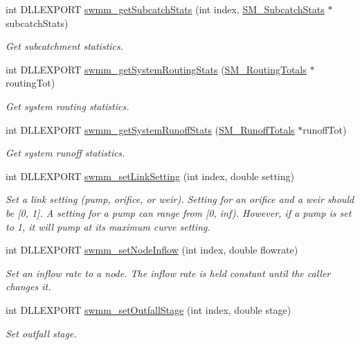 \begin{DoxyCompactItemize}
int D\+L\+L\+E\+X\+P\+O\+RT \hyperlink{group__tkfuncs_ga07cf0c633357b86bfcd0886fed0ae2fb}{swmm\+\_\+get\+Subcatch\+Stats} (int index, \hyperlink{struct_s_m___subcatch_stats}{S\+M\+\_\+\+Subcatch\+Stats} $\ast$subcatch\+Stats)
\begin{DoxyCompactList}\small\item\em Get subcatchment statistics. \end{DoxyCompactList}\item 
int D\+L\+L\+E\+X\+P\+O\+RT \hyperlink{group__tkfuncs_ga8e4dcd4d9243ac428633e7cdabf0712a}{swmm\+\_\+get\+System\+Routing\+Stats} (\hyperlink{struct_s_m___routing_totals}{S\+M\+\_\+\+Routing\+Totals} $\ast$routing\+Tot)
\begin{DoxyCompactList}\small\item\em Get system routing statistics. \end{DoxyCompactList}\item 
int D\+L\+L\+E\+X\+P\+O\+RT \hyperlink{group__tkfuncs_gabf3ea290e2af763289e18db435ea2ccd}{swmm\+\_\+get\+System\+Runoff\+Stats} (\hyperlink{struct_s_m___runoff_totals}{S\+M\+\_\+\+Runoff\+Totals} $\ast$runoff\+Tot)
\begin{DoxyCompactList}\small\item\em Get system runoff statistics. \end{DoxyCompactList}\item 
int D\+L\+L\+E\+X\+P\+O\+RT \hyperlink{group__tkfuncs_gab44d2b1c21a6f750b0ce4c48ba16be81}{swmm\+\_\+set\+Link\+Setting} (int index, double setting)
\begin{DoxyCompactList}\small\item\em Set a link setting (pump, orifice, or weir). Setting for an orifice and a weir should be \mbox{[}0, 1\mbox{]}. A setting for a pump can range from \mbox{[}0, inf). However, if a pump is set to 1, it will pump at its maximum curve setting. \end{DoxyCompactList}\item 
int D\+L\+L\+E\+X\+P\+O\+RT \hyperlink{group__tkfuncs_ga6438a8a45d7712b8b02ba630cd8e1db3}{swmm\+\_\+set\+Node\+Inflow} (int index, double flowrate)
\begin{DoxyCompactList}\small\item\em Set an inflow rate to a node. The inflow rate is held constant until the caller changes it. \end{DoxyCompactList}\item 
int D\+L\+L\+E\+X\+P\+O\+RT \hyperlink{group__tkfuncs_ga80d902400625073d8ff2c392365fde9b}{swmm\+\_\+set\+Outfall\+Stage} (int index, double stage)
\begin{DoxyCompactList}\small\item\em Set outfall stage. \end{DoxyCompactList}\end{DoxyCompactItemize}


